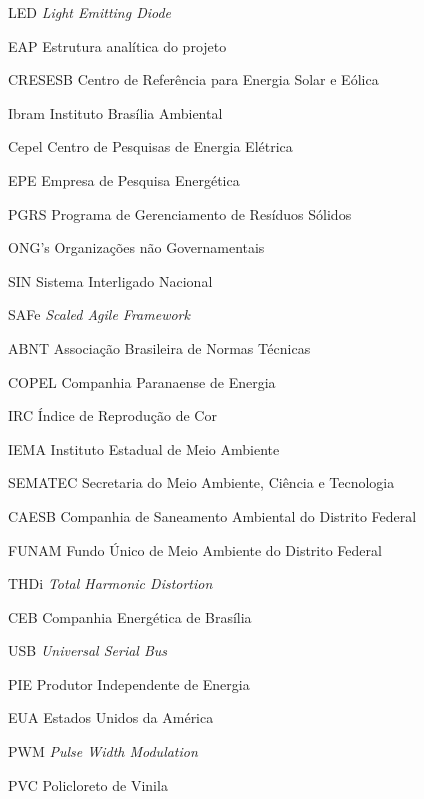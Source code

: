 \begin{siglas}
  \item[LED] \textit {Light Emitting Diode}
  \item[EAP] Estrutura anal\'itica do projeto
  \item[CRESESB] Centro de Refer\^encia para Energia Solar e E\'olica
  \item[Ibram] Instituto Bras\'ilia Ambiental
  \item[Cepel] Centro de Pesquisas de Energia El\'etrica
  \item[EPE] Empresa de Pesquisa Energ\'etica
  \item[PGRS] Programa de Gerenciamento de Res\'iduos S\'olidos
  \item[ONG's] Organiza\c{c}\~oes n\~ao Governamentais
  \item[SIN] Sistema Interligado Nacional
  \item[SAFe] \textit{Scaled Agile Framework}
  \item[ABNT] Associa\c{c}\~ao Brasileira de Normas T\'ecnicas
  \item[COPEL] Companhia Paranaense de Energia
  \item[IRC] \'Indice de Reprodu\c{c}\~ao de Cor
  \item[IEMA] Instituto Estadual de Meio Ambiente
  \item[SEMATEC] Secretaria do Meio Ambiente, Ci\^encia e Tecnologia
  \item[CAESB] Companhia de Saneamento Ambiental do Distrito Federal
  \item[FUNAM] Fundo \'Unico de Meio Ambiente do Distrito Federal
  \item[THDi] \textit{Total Harmonic Distortion}
  \item[CEB] Companhia Energ\'etica de Bras\'ilia
  \item[USB] \textit{Universal Serial Bus}
  \item[PIE] Produtor Independente de Energia
  \item[EUA] Estados Unidos da Am\'erica
  \item[PWM] \textit{Pulse Width Modulation}
  \item[PVC] Policloreto de Vinila
\end{siglas}
